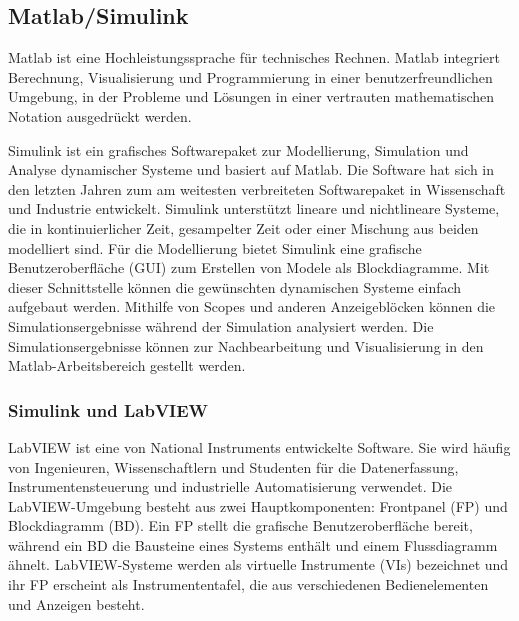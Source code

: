 


\subsection{Matlab/Simulink}

Matlab ist eine Hochleistungssprache für technisches Rechnen. Matlab integriert Berechnung, Visualisierung und Programmierung in einer benutzerfreundlichen Umgebung, in der Probleme und Lösungen in einer vertrauten mathematischen Notation ausgedrückt werden.

Simulink ist ein grafisches Softwarepaket zur Modellierung, Simulation und Analyse dynamischer Systeme und basiert auf Matlab. 
Die Software hat sich in den letzten Jahren zum am weitesten verbreiteten Softwarepaket in Wissenschaft und Industrie entwickelt.
Simulink unterstützt lineare und nichtlineare Systeme, die in kontinuierlicher Zeit, gesampelter Zeit oder einer Mischung aus beiden modelliert sind. Für die Modellierung bietet Simulink eine grafische Benutzeroberfläche (GUI) zum Erstellen von Modele als Blockdiagramme. Mit dieser Schnittstelle können die gewünschten dynamischen Systeme einfach aufgebaut werden. Mithilfe von Scopes und anderen Anzeigeblöcken können die Simulationsergebnisse während der Simulation analysiert werden. Die Simulationsergebnisse können zur Nachbearbeitung und Visualisierung in den Matlab-Arbeitsbereich gestellt werden. \citep{Iov2004}\citep{Karris2008}\\



\subsubsection{Simulink und LabVIEW} 
LabVIEW ist eine von \glqq National Instruments\grqq{} entwickelte Software. Sie wird häufig von Ingenieuren, Wissenschaftlern und Studenten für die Datenerfassung, Instrumentensteuerung und industrielle Automatisierung verwendet. Die LabVIEW-Umgebung besteht aus zwei Hauptkomponenten: Frontpanel (FP) und Blockdiagramm (BD). Ein FP stellt die grafische Benutzeroberfläche bereit, während ein BD die Bausteine eines Systems enthält und einem Flussdiagramm ähnelt. LabVIEW-Systeme werden als virtuelle Instrumente (VIs) bezeichnet und ihr FP erscheint als Instrumententafel, die aus verschiedenen Bedienelementen und Anzeigen besteht.


